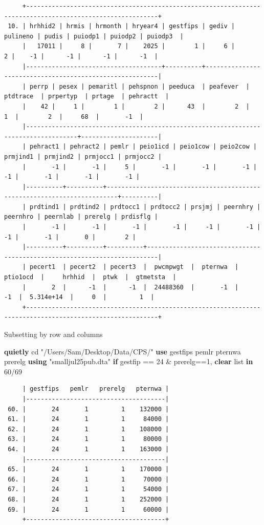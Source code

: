 \documentclass[
]{book}
\newenvironment{Shaded}{\begin{snugshade}}{\end{snugshade}}
\newcommand{\KeywordTok}[1]{\textcolor[rgb]{0.13,0.29,0.53}{\textbf{#1}}}
\newcommand{\NormalTok}[1]{#1}
\newcommand{\OtherTok}[1]{\textcolor[rgb]{0.56,0.35,0.01}{#1}}
\newcommand{\StringTok}[1]{\textcolor[rgb]{0.31,0.60,0.02}{#1}}
\begin{document}
\begin{verbatim}
     +----------------------------------------------------------------------------------------------------------+
 10. | hrhhid2 | hrmis | hrmonth | hryear4 | gestfips | gediv | pulineno | pudis | puiodp1 | puiodp2 | puiodp3  |
     |   17011 |     8 |       7 |    2025 |        1 |     6 |        2 |    -1 |      -1 |      -1 |      -1  |
     |-------------------------------------+----------+---------------------------------------------------------|
     | perrp | pesex | pemaritl | pehspnon | peeduca  | peafever  | ptdtrace  | prpertyp  | prtage  | pehractt  |
     |    42 |     1 |        1 |        2 |      43  |        2  |        1  |        2  |     68  |       -1  |
     |------------------------------------------------------------------------------------+---------------------|
     | pehract1 | pehract2 | pemlr | peio1icd | peio1cow | peio2cow | prmjind1 | prmjind2 | prmjocc1 | prmjocc2 |
     |       -1 |       -1 |     5 |       -1 |       -1 |       -1 |       -1 |       -1 |       -1 |       -1 |
     |----------+----------+-------------------------------------------------------------------------+----------|
     | prdtind1 | prdtind2 | prdtocc1 | prdtocc2 | prsjmj | peernhry | peernhro | peernlab | prerelg | prdisflg |
     |       -1 |       -1 |       -1 |       -1 |     -1 |       -1 |       -1 |       -1 |       0 |        2 |
     |----------+----------+----------+-------------------------------------------------------------------------|
     | pecert1  | pecert2  | pecert3  |  pwcmpwgt  |  pternwa  |  ptio1ocd  |     hrhhid  |  ptwk  |  gtmetsta  |
     |       2  |      -1  |      -1  |  24488360  |       -1  |        -1  |  5.314e+14  |     0  |         1  |
     +----------------------------------------------------------------------------------------------------------+
\end{verbatim}

Subsetting by row and columns

\begin{Shaded}
\begin{Highlighting}[]
\KeywordTok{quietly}\NormalTok{ cd }\StringTok{"/Users/Sam/Desktop/Data/CPS/"}
\KeywordTok{use}\NormalTok{ gestfips pemlr pternwa prerelg }\KeywordTok{using} \StringTok{"smalljul25pub.dta"} \KeywordTok{if}\NormalTok{ gestfip == 24 \& prerelg==1, }\KeywordTok{clear}
\OtherTok{list} \KeywordTok{in}\NormalTok{ 60/69}
\end{Highlighting}
\end{Shaded}

\begin{verbatim}
     | gestfips   pemlr   prerelg   pternwa |
     |--------------------------------------|
 60. |       24       1         1    132000 |
 61. |       24       1         1     84000 |
 62. |       24       1         1    108000 |
 63. |       24       1         1     80000 |
 64. |       24       1         1    163000 |
     |--------------------------------------|
 65. |       24       1         1    170000 |
 66. |       24       1         1     70000 |
 67. |       24       1         1     54000 |
 68. |       24       1         1    252000 |
 69. |       24       1         1     60000 |
     +--------------------------------------+
\end{verbatim}
\end{document}
